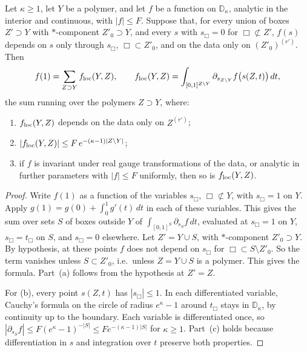 \begin{lemma}[Localization]\label{lem:localization}
Let $\kappa\ge1$, let $Y$ be a polymer, and let $f$ be a function on $\mathbb D_\kappa$, analytic in the interior and continuous, with $|f|\le F$. Suppose that, for every union of boxes $Z'\supset Y$ with $*$-component $Z'_0\supset Y$, and every $s$ with $s_\Box=0$ for $\Box\not\subset Z'$, $f(s)$ depends on $s$ only through $s_\Box$, $\Box\subset Z'_0$, and on the data only on $(Z'_0)^{(r')}$. Then
\[
f(1)=\sum_{Z\supset Y}f_{\rm loc}(Y,Z),\qquad f_{\rm loc}(Y,Z)=\int_{[0,1]^{Z\setminus Y}}\partial_{s_{Z\setminus Y}}f\big(s(Z,t)\big)\,dt ,
\]
the sum running over the polymers $Z\supset Y$, where:
\begin{enumerate}[label=(\alph*)]
\item $f_{\rm loc}(Y,Z)$ depends on the data only on $Z^{(r')}$;
\item $|f_{\rm loc}(Y,Z)|\le F\,e^{-(\kappa-1)|Z\setminus Y|}$;
\item if $f$ is invariant under real gauge transformations of the data, or analytic in further parameters with $|f|\le F$ uniformly, then so is $f_{\rm loc}(Y,Z)$.
\end{enumerate}
\end{lemma}

\begin{proof}
Write $f(1)$ as a function of the variables $s_\Box$, $\Box\not\subset Y$, with $s_\Box=1$ on $Y$. Apply $g(1)=g(0)+\int_0^1g'(t)\,dt$ in each of these variables. This gives the sum over sets $S$ of boxes outside $Y$ of $\int_{[0,1]^S}\partial_{s_S}f\,dt$, evaluated at $s_\Box=1$ on $Y$, $s_\Box=t_\Box$ on $S$, and $s_\Box=0$ elsewhere. Let $Z'=Y\cup S$, with $*$-component $Z'_0\supset Y$. By hypothesis, at these points $f$ does not depend on $s_\Box$ for $\Box\subset S\setminus Z'_0$. So the term vanishes unless $S\subset Z'_0$, i.e.\ unless $Z=Y\cup S$ is a polymer. This gives the formula. Part~(a) follows from the hypothesis at $Z'=Z$.

For (b), every point $s(Z,t)$ has $|s_\Box|\le1$. In each differentiated variable, Cauchy's formula on the circle of radius $e^\kappa-1$ around $t_\Box$ stays in $\mathbb D_\kappa$, by continuity up to the boundary. Each variable is differentiated once, so $|\partial_{s_S}f|\le F(e^\kappa-1)^{-|S|}\le Fe^{-(\kappa-1)|S|}$ for $\kappa\ge1$. Part~(c) holds because differentiation in $s$ and integration over $t$ preserve both properties.
\end{proof}


